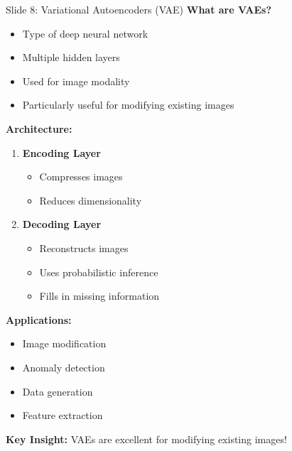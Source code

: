 \documentclass[8pt]{beamer}
\begin{document}
	\begin{frame}{Slide 8: Variational Autoencoders (VAE)}
		\fontsize{6.5}{7.5}\selectfont
		\textbf{What are VAEs?}
		\begin{itemize}
			\item Type of deep neural network
			\item Multiple hidden layers
			\item Used for image modality
			\item Particularly useful for modifying existing images
		\end{itemize}
		
		\vspace{0.1cm}
		\textbf{Architecture:}
		\begin{enumerate}
			\item \textbf{Encoding Layer}
			\begin{itemize}
				\item Compresses images
				\item Reduces dimensionality
			\end{itemize}
			\item \textbf{Decoding Layer}
			\begin{itemize}
				\item Reconstructs images
				\item Uses probabilistic inference
				\item Fills in missing information
			\end{itemize}
		\end{enumerate}
		
		\vspace{0.1cm}
		\textbf{Applications:}
		\begin{itemize}
			\item Image modification
			\item Anomaly detection
			\item Data generation
			\item Feature extraction
		\end{itemize}
		
		\textcolor{myblue}{\textbf{Key Insight:}} VAEs are excellent for modifying existing images!
	\end{frame}
	
\end{document}

